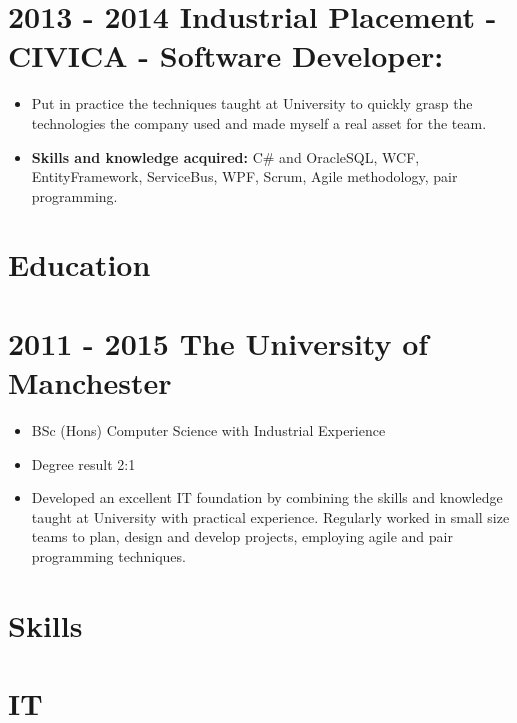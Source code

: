 \documentclass[12pt,a4paper]{res}
\begin{document}
\begin{resume}
\section{\bf 2013 - 2014 \hspace{0.5mm} Industrial Placement - CIVICA - Software Developer:}
\vspace{5mm}    
	\begin{itemize}
	\item[] Put in practice the techniques taught at University to quickly grasp the technologies the company used and made myself a real asset for the team.
	\item{\bf Skills and knowledge acquired:} C\# and OracleSQL, WCF, EntityFramework, ServiceBus, WPF, Scrum, Agile methodology, pair programming.
	\end{itemize}

\newpage 

\section{\large\bf Education}
\vspace{5mm}

\section{\bf 2011 - 2015 \hspace{1.5mm}The University of Manchester}
  
  \begin{itemize} %
     \item[] BSc (Hons) Computer Science  with Industrial Experience
     \item[] Degree result 2:1

     \item Developed an excellent IT foundation by combining the skills and knowledge taught at University with practical experience. Regularly worked in small size teams to plan, design and develop projects, employing agile and pair programming techniques.
   \end{itemize}

	
\section{\large\bf Skills}
\vspace{2mm}
\section{IT}
\vspace{-1mm}
  \begin{itemize}


\end{itemize}
\end{resume}
\end{document}
